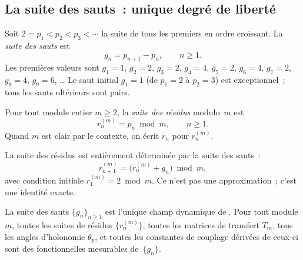 \documentclass[12pt,a4paper]{article}
\begin{document}
\subsection{La suite des sauts~: unique degré de liberté}
\label{sec:gap_sequence}

\begin{definition}
\label{def:gaps}
Soit $2 = p_1 < p_2 < p_3 < \cdots$ la suite de tous les premiers en
ordre croissant. La \emph{suite des sauts} est
\begin{equation}
  g_n = p_{n+1} - p_n, \qquad n \geq 1.
  \label{eq:gap_def}
\end{equation}
Les premières valeurs sont $g_1 = 1$, $g_2 = 2$, $g_3 = 2$, $g_4 = 4$,
$g_5 = 2$, $g_6 = 4$, $g_7 = 2$, $g_8 = 4$, $g_9 = 6$, \ldots
Le saut initial $g_1 = 1$ (de $p_1=2$ à $p_2=3$) est exceptionnel~;
tous les sauts ultérieurs sont pairs.
\end{definition}

\begin{definition}
\label{def:residue}
Pour tout module entier $m \geq 2$, la \emph{suite des résidus}
modulo~$m$ est
\begin{equation}
  r_n^{(m)} = p_n \bmod m, \qquad n \geq 1.
  \label{eq:residue_def}
\end{equation}
Quand $m$ est clair par le contexte, on écrit $r_n$ pour $r_n^{(m)}$.
\end{definition}

La suite des résidus est entièrement déterminée par la suite des
sauts~:
\begin{equation}
  r_{n+1}^{(m)} = \bigl(r_n^{(m)} + g_n\bigr) \bmod m,
  \label{eq:gauge_connection}
\end{equation}
avec condition initiale $r_1^{(m)} = 2 \bmod m$. Ce n'est pas une
approximation~; c'est une identité exacte.

\mTHM
\begin{theoreme}
\label{thm:unique_dof}
La suite des sauts $\{g_n\}_{n \geq 1}$ est l'unique champ dynamique
de \PT. Pour tout module $m$, toutes les suites de résidus
$\{r_n^{(m)}\}$, toutes les matrices de transfert $T_m$, tous les
angles d'holonomie $\theta_p$, et toutes les constantes de couplage
dérivées de ceux-ci sont des fonctionnelles mesurables de~$\{g_n\}$.
\end{theoreme}
\end{document}
